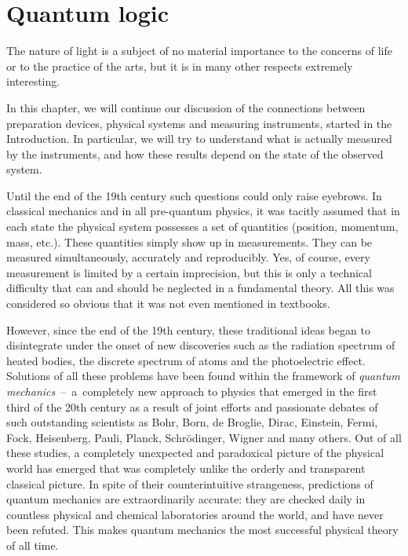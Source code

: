 \documentclass[nochecklpage]{stefan1}
\theoremstyle{definition}
\begin{document}
\chapter{Quantum logic}\label{ch:QM}

\begin{epigraph}
The nature of light is a subject of no material importance to
the concerns of life or to the practice of the arts, but it is in many
other respects extremely interesting.
%
\author{Thomas Young}
\end{epigraph}
%
%
In this chapter, we will continue our discussion of the connections
between preparation devices, physical systems and measuring instruments,
started in the Introduction. In particular, we will try to understand
what is actually measured by the instruments, and how these results
depend on the state of the observed system.

Until the end of the 19th century such questions could only raise
eyebrows. In classical mechanics and in all pre-quantum physics, it was
tacitly assumed that in each state the physical system possesses a set
of quantities (position, momentum, mass, etc.). These quantities simply
show up in measurements. They can be measured simultaneously, accurately
and reproducibly. Yes, of course, every measurement is limited by a
certain imprecision, but this is only a technical difficulty that can
and should be neglected in a fundamental theory. All this was considered
so obvious that it was not even mentioned in textbooks.

However, since the end of the 19th century, these traditional ideas
began to disintegrate under the onset of new discoveries such as the
radiation spectrum of heated bodies, the discrete spectrum of atoms and
the photoelectric effect. Solutions of all these problems have been
found within the framework of
\emph{quantum mechanics}~--~a~completely new approach to physics that
emerged in the first third of the 20th century as a result of joint
efforts and passionate debates of such outstanding scientists as Bohr,
Born, de Broglie, Dirac, Einstein, Fermi, Fock, Heisenberg, Pauli,
Planck, Schr\"{o}dinger, Wigner and many
others.
Out of all these
studies, a completely unexpected and paradoxical picture of the physical
world has emerged that was completely unlike the orderly and transparent
classical picture. In spite of their counterintuitive strangeness,
predictions of quantum mechanics are extraordinarily accurate: they are
checked daily in countless physical and chemical laboratories around the
world, and have never been refuted. This makes quantum mechanics the
most successful physical theory of all time.
\end{document}
